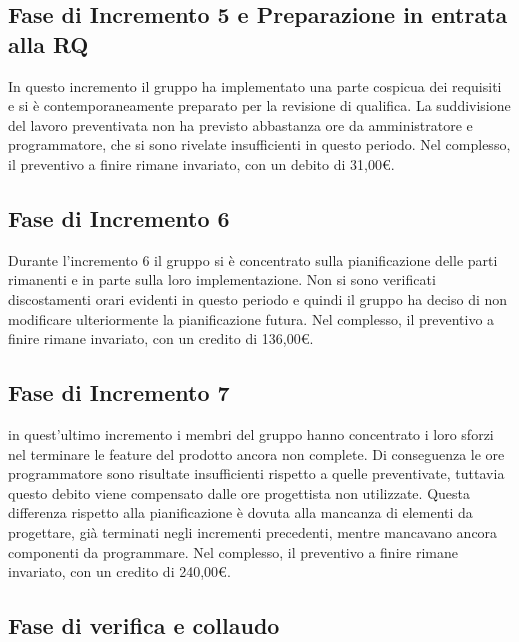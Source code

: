 \documentclass[../piano-di-progetto.tex]{subfiles}
\begin{document}
\subsection{Fase di Incremento 5 e Preparazione in entrata alla RQ}%
\label{sub:preventivo_a_finire/fase_di_incremento_5}

In questo incremento il gruppo ha implementato una parte cospicua dei requisiti e si è contemporaneamente preparato per la revisione di qualifica.
La suddivisione del lavoro preventivata non ha previsto abbastanza ore da amministratore e programmatore, che si sono rivelate insufficienti in questo periodo.
Nel complesso, il preventivo a finire rimane invariato, con un debito di 31,00€.

\subsection{Fase di Incremento 6}%
\label{sub:preventivo_a_finire/fase_di_incremento_6}

Durante l'incremento 6 il gruppo si è concentrato sulla pianificazione delle parti rimanenti e in parte sulla loro implementazione.
Non si sono verificati discostamenti orari evidenti in questo periodo e quindi il gruppo ha deciso di non modificare ulteriormente la pianificazione futura.
Nel complesso, il preventivo a finire rimane invariato, con un credito di 136,00€.

\subsection{Fase di Incremento 7}%
\label{sub:preventivo_a_finire/fase_di_incremento_7}

in quest'ultimo incremento i membri del gruppo hanno concentrato i loro sforzi nel terminare le feature del prodotto ancora non complete.
Di conseguenza le ore programmatore sono risultate insufficienti rispetto a quelle preventivate, tuttavia questo debito viene compensato dalle ore progettista non utilizzate.
Questa differenza rispetto alla pianificazione è dovuta alla mancanza di elementi da progettare, già terminati negli incrementi precedenti, mentre mancavano ancora componenti da programmare.
Nel complesso, il preventivo a finire rimane invariato, con un credito di 240,00€.

\subsection{Fase di verifica e collaudo}%
\label{sub:preventivo_a_finire/verifica_e_collaudo}
\end{document}
